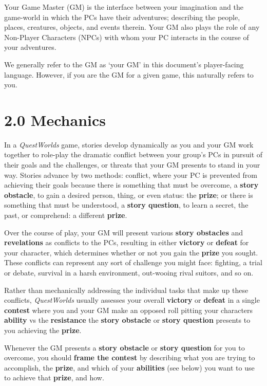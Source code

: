 \documentclass[
  11pt,
]{article}
\begin{document}
Your Game Master (GM) is the interface between your imagination and the
game-world in which the PCs have their adventures; describing the
people, places, creatures, objects, and events therein. Your GM also
plays the role of any Non-Player Characters (NPCs) with whom your PC
interacts in the course of your adventures.

We generally refer to the GM as `your GM' in this document's
player-facing language. However, if you are the GM for a given game,
this naturally refers to you.

\hypertarget{mechanics}{%
\section{2.0 Mechanics}\label{mechanics}}

In a \emph{QuestWorlds} game, stories develop dynamically as you and
your GM work together to role-play the dramatic conflict between your
group's PCs in pursuit of their goals and the challenges, or threats
that your GM presents to stand in your way. Stories advance by two
methods: conflict, where your PC is prevented from achieving their goals
because there is something that must be overcome, a \textbf{story
obstacle}, to gain a desired person, thing, or even status: the
\textbf{prize}; or there is something that must be understood, a
\textbf{story question}, to learn a secret, the past, or comprehend: a
different \textbf{prize}.

Over the course of play, your GM will present various \textbf{story
obstacles} and \textbf{revelations} as conflicts to the PCs, resulting
in either \textbf{victory} or \textbf{defeat} for your character, which
determines whether or not you gain the \textbf{prize} you sought. These
conflicts can represent any sort of challenge you might face: fighting,
a trial or debate, survival in a harsh environment, out-wooing rival
suitors, and so on.

Rather than mechanically addressing the individual tasks that make up
these conflicts, \emph{QuestWorlds} usually assesses your overall
\textbf{victory} or \textbf{defeat} in a single \textbf{contest} where
you and your GM make an opposed roll pitting your characters
\textbf{ability} vs the \textbf{resistance} the \textbf{story obstacle}
or \textbf{story question} presents to you achieving the \textbf{prize}.

Whenever the GM presents a \textbf{story obstacle} or \textbf{story
question} for you to overcome, you should \textbf{frame the contest} by
describing what you are trying to accomplish, the \textbf{prize}, and
which of your \textbf{abilities} (see below) you want to use to achieve
that \textbf{prize}, and how.
\end{document}

